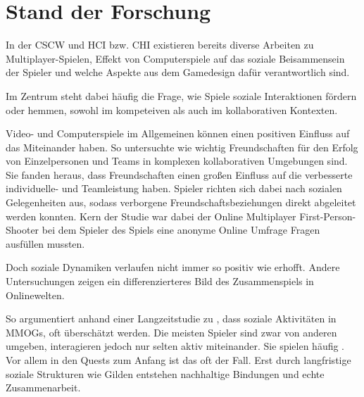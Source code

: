\chapter{Stand der Forschung}\label{sec:related-works}


In der \ac{CSCW} und \ac{HCI} bzw. \ac{CHI} existieren bereits diverse Arbeiten zu Multiplayer-Spielen, Effekt von Computerspiele auf das soziale Beisammensein der Spieler und welche Aspekte aus dem Gamedesign dafür verantwortlich sind.

Im Zentrum steht dabei häufig die Frage, wie Spiele soziale Interaktionen fördern oder hemmen, sowohl im kompeteiven als auch im kollaborativen Kontexten.

Video- und Computerspiele im Allgemeinen können einen positiven Einfluss auf das Miteinander haben. So untersuchte \cite{mason_friends_2013} wie wichtig Freundschaften für den Erfolg von Einzelpersonen und Teams in komplexen kollaborativen Umgebungen sind. Sie fanden heraus, dass Freundschaften einen großen Einfluss auf die verbesserte individuelle- und Teamleistung haben. Spieler richten sich dabei nach sozialen Gelegenheiten aus, sodass verborgene Freundschaftsbeziehungen direkt abgeleitet werden konnten. Kern der Studie war dabei der Online Multiplayer First-Person-Shooter  bei dem Spieler des Spiels eine anonyme Online Umfrage Fragen ausfüllen mussten. 

Doch soziale Dynamiken verlaufen nicht immer so positiv wie erhofft. Andere Untersuchungen zeigen ein differenzierteres Bild des Zusammenspiels in Onlinewelten.

So argumentiert \cite{ducheneaut_alone_2006} anhand einer Langzeitstudie zu , dass soziale Aktivitäten in \ac{MMOG}s, oft überschätzt werden. Die meisten Spieler sind zwar von anderen umgeben, interagieren jedoch nur selten aktiv miteinander. Sie spielen häufig . Vor allem in den Quests zum Anfang ist das oft der Fall. Erst durch langfristige soziale Strukturen wie Gilden entstehen nachhaltige Bindungen und echte Zusammenarbeit.

